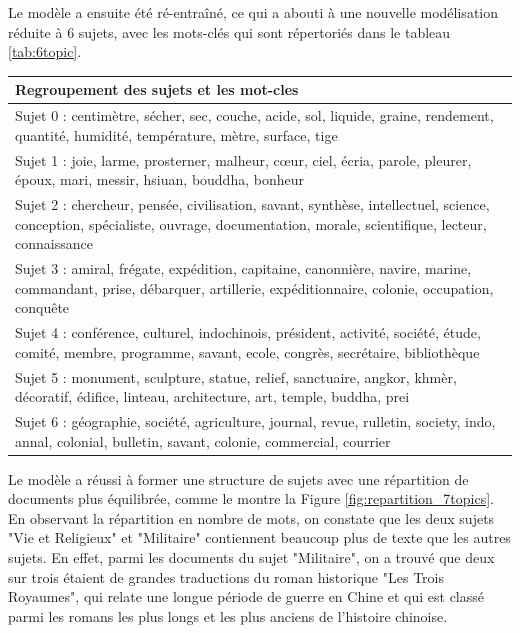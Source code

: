 Le modèle a ensuite été ré-entraîné, ce qui a abouti à une nouvelle modélisation réduite à 6 sujets, avec les mots-clés qui sont répertoriés dans le tableau \ref{tab:6topic}.

\begin{center}
\begin{tabular}{|p{15cm}|}
\hline
Regroupement des sujets et les mot-cles\\
\hline
 Sujet 0 : centimètre, sécher, sec, couche, acide, sol, liquide, graine, rendement, quantité, humidité, température, mètre, surface, tige \\ \hline
 Sujet 1 : joie, larme, prosterner, malheur, cœur, ciel, écria, parole, pleurer, époux, mari, messir, hsiuan, bouddha, bonheur \\ \hline
 Sujet 2 : chercheur, pensée, civilisation, savant, synthèse, intellectuel, science, conception, spécialiste, ouvrage, documentation, morale, scientifique, lecteur, connaissance \\ \hline
 Sujet 3 : amiral, frégate, expédition, capitaine, canonnière, navire, marine, commandant, prise, débarquer, artillerie, expéditionnaire, colonie, occupation, conquête \\ \hline
 Sujet 4 : conférence, culturel, indochinois, président, activité, société, étude, comité, membre, programme, savant, ecole, congrès, secrétaire, bibliothèque \\ \hline
 Sujet 5 : monument, sculpture, statue, relief, sanctuaire, angkor, khmèr, décoratif, édifice, linteau, architecture, art, temple, buddha, prei \\ \hline
 Sujet 6 : géographie, société, agriculture, journal, revue, rulletin, society, indo, annal, colonial, bulletin, savant, colonie, commercial, courrier \\ \hline
\end{tabular}
\label{tab:6topic}
\end{center}

Le modèle a réussi à former une structure de sujets avec une répartition de documents plus équilibrée, comme le montre la Figure \ref{fig:repartition_7topics}. En observant la répartition en nombre de mots, on constate que les deux sujets "Vie et Religieux" et "Militaire" contiennent beaucoup plus de texte que les autres sujets. En effet, parmi les documents du sujet "Militaire", on a trouvé que deux sur trois étaient de grandes traductions du roman historique "Les Trois Royaumes", qui relate une longue période de guerre en Chine et qui est classé parmi les romans les plus longs et les plus anciens de l'histoire chinoise.

